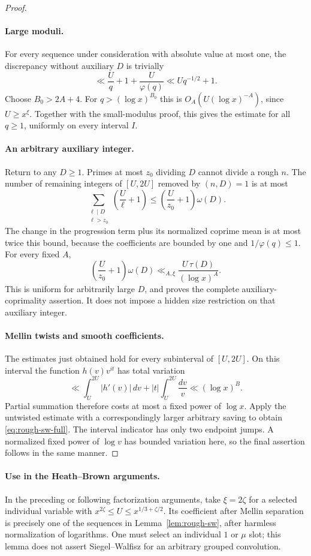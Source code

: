 \documentclass[11pt]{article}
\begin{document}
\begin{proof}
\paragraph{Large moduli.}
For every sequence under consideration with absolute value
at most one, the discrepancy without auxiliary $D$ is trivially
\[
 \ll \frac Uq+1+\frac U{\varphi(q)}
       \ll Uq^{-1/2}+1.
\]
Choose $B_0>2A+4$. For $q>(\log x)^{B_0}$ this is
$O_A(U(\log x)^{-A})$, since $U\ge x^\xi$.
Together with the small-modulus proof, this gives the estimate
for all $q\ge1$, uniformly on every interval $I$.

\paragraph{An arbitrary auxiliary integer.}
Return to any $D\ge1$.
Primes at most $z_0$ dividing $D$ cannot divide a rough $n$.
The number of remaining integers of $[U,2U]$ removed by
$(n,D)=1$ is at most
\[
 \sum_{\substack{\ell\mid D\\\ell>z_0}}
           \left(\frac U\ell+1\right)
       \le\left(\frac U{z_0}+1\right)\omega(D).
\]
The change in the progression term plus its normalized
coprime mean is at most twice this bound, because the
coefficients are bounded by one and $1/\varphi(q)\le1$.
For every fixed $A$,
\[
 \left(\frac U{z_0}+1\right)\omega(D)
        \ll_{A,\xi}\frac{U\,\tau(D)}{(\log x)^A}.
\]
This is uniform for arbitrarily large $D$, and proves the
complete auxiliary-coprimality assertion. It does not
impose a hidden size restriction on that auxiliary integer.

\paragraph{Mellin twists and smooth coefficients.}
The estimates just obtained hold for every subinterval
of $[U,2U]$.
On this interval the function $h(v)v^{it}$ has total variation
\[
 \ll \int_U^{2U}|h'(v)|\,dv
                 +|t|\int_U^{2U}\frac{dv}{v}
 \ll(\log x)^B.
\]
Partial summation therefore costs at most a fixed power of
$\log x$. Apply the untwisted estimate with a correspondingly
larger arbitrary saving to obtain \eqref{eq:rough-sw-full}.
The interval indicator has only two endpoint jumps.
A normalized fixed power of $\log v$ has bounded variation
here, so the final assertion follows in the same manner.
\end{proof}

\paragraph{Use in the Heath--Brown arguments.}
In the preceding or following factorization arguments, take
$\xi=2\zeta$ for a selected individual variable with
$x^{2\zeta}\le U\le x^{1/3+\zeta/2}$.
Its coefficient after Mellin separation is precisely one of
the sequences in Lemma~\ref{lem:rough-sw}, after harmless
normalization of logarithms.
One must select an individual $1$ or $\mu$ slot; this lemma
does not assert Siegel--Walfisz for an arbitrary grouped
convolution.
\end{document}
